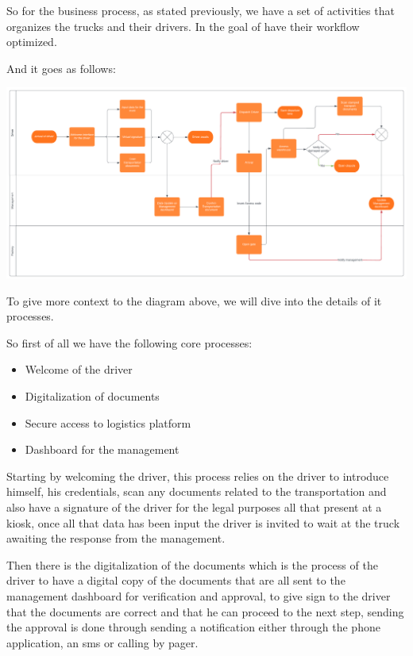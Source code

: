 So for the business process, as stated previously, we have a set of activities that organizes the trucks and their drivers.
In the goal of have their workflow optimized.

And it goes as follows:

\begin{center}
    \includegraphics[width=1\textwidth]{images/flowchart}
\end{center}

To give more context to the diagram above, we will dive into the details of it processes.

So first of all we have the following core processes:

\begin{itemize}
    \item Welcome of the driver
    \item Digitalization of documents
    \item Secure access to logistics platform
    \item Dashboard for the management
\end{itemize}

Starting by welcoming the driver, this process relies on the driver to introduce himself, his credentials,
scan any documents related to the transportation and also have a signature of the driver for the legal purposes
all that present at a kiosk, once all that data has been input the driver is invited to wait at the truck awaiting
the response from the management.

Then there is the digitalization of the documents which is the process of the driver to have a digital copy
of the documents that are all sent to the management dashboard for verification and approval, to give sign
to the driver that the documents are correct and that he can proceed to the next step, sending the approval
is done through sending a notification either through the phone application, an sms or calling by pager.

